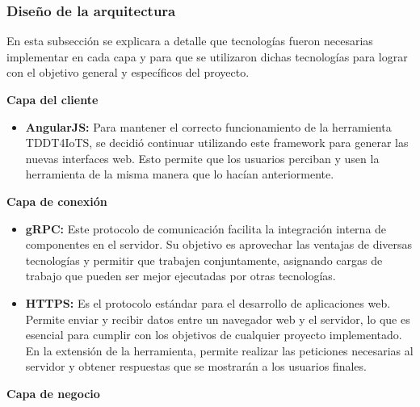 \subsubsection{Diseño de la arquitectura}

En esta subsección se explicara a detalle que tecnologías fueron necesarias implementar en cada capa y para que se utilizaron dichas tecnologías para lograr con el objetivo general y específicos del proyecto. 

\textbf{Capa del cliente}

\begin{itemize}
	\item \textbf{AngularJS:} Para mantener el correcto funcionamiento de la herramienta TDDT4IoTS, se decidió continuar utilizando este framework para generar las nuevas interfaces web. Esto permite que los usuarios perciban y usen la herramienta de la misma manera que lo hacían anteriormente.
\end{itemize}

\textbf{Capa de conexión}

\begin{itemize}
	\item \textbf{gRPC:} Este protocolo de comunicación facilita la integración interna de componentes en el servidor. Su objetivo es aprovechar las ventajas de diversas tecnologías y permitir que trabajen conjuntamente, asignando cargas de trabajo que pueden ser mejor ejecutadas por otras tecnologías.
	
	\item \textbf{HTTPS:} Es el protocolo estándar para el desarrollo de aplicaciones web. Permite enviar y recibir datos entre un navegador web y el servidor, lo que es esencial para cumplir con los objetivos de cualquier proyecto implementado. En la extensión de la herramienta, permite realizar las peticiones necesarias al servidor y obtener respuestas que se mostrarán a los usuarios finales.
	
\end{itemize}

\textbf{Capa de negocio}

